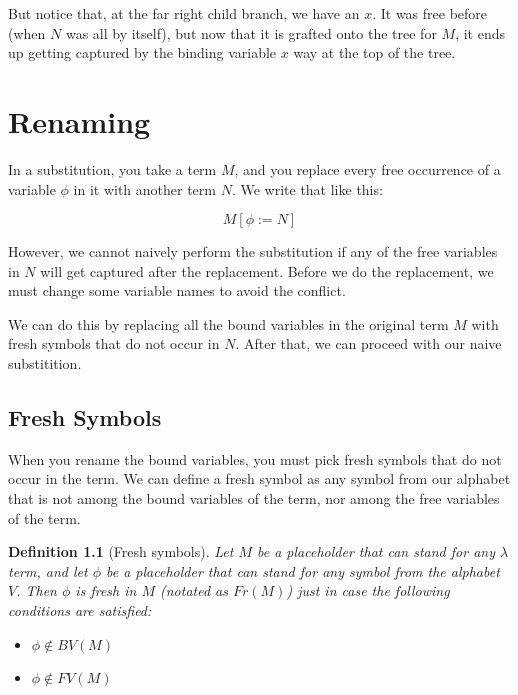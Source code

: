 \documentclass{book}
\numberwithin{equation}{chapter}
\newtheorem{definition}{Definition}
\begin{document}
\noindent
But notice that, at the far right child branch, we have an $x$. It was free before (when $N$ was all by itself), but now that it is grafted onto the tree for $M$, it ends up getting captured by the binding variable $x$ way at the top of the tree.



\chapter{Renaming}

In a substitution, you take a term $M$, and you replace every free occurrence of a variable $\phi$ in it with another term $N$. We write that like this:

\begin{equation}
M[\phi := N]
\end{equation}

\noindent
However, we cannot naively perform the substitution if any of the free variables in $N$ will get captured after the replacement. Before we do the replacement, we must change some variable names to avoid the conflict.

We can do this by replacing all the bound variables in the original term $M$ with fresh symbols that do not occur in $N$. After that, we can proceed with our naive substitition. 


\section{Fresh Symbols}

When you rename the bound variables, you must pick fresh symbols that do not occur in the term. We can define a fresh symbol as any symbol from our alphabet that is not among the bound variables of the term, nor among the free variables of the term.

\begin{definition}[Fresh symbols]
Let $M$ be a placeholder that can stand for any $\lambda$ term, and let $\phi$ be a placeholder that can stand for any symbol from the alphabet $V$. Then $\phi$ is fresh in $M$ (notated as $Fr(M)$) just in case the following conditions are satisfied:

\begin{itemize}
\item{$\phi \notin BV(M)$}
\item{$\phi \notin FV(M)$}
\end{itemize}
\end{definition}
\end{document}
